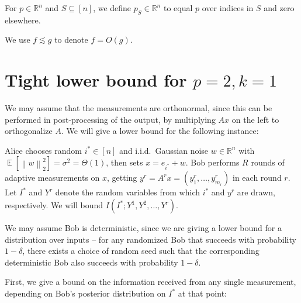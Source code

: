 \documentclass[twoside,leqno,twocolumn]{article}
\newcommand{\norm}[2]{\left \lVert#2\right \rVert_{#1}}
\DeclareMathOperator*{\E}{\mathbb{E}}
\def\R{\mathbb{R}}
\begin{document}
For $p \in \R^n$ and $S \subseteq [n]$, we define $p_S \in \R^n$ to
equal $p$ over indices in $S$ and zero elsewhere.

We use $f \lesssim g$ to denote $f = O(g)$.

\section{Tight lower bound for $p=2, k=1$ }

We may assume that the measurements are orthonormal, since this can be
performed in post-processing of the output, by multiplying $Ax$ on the
left to orthogonalize $A$.  We will give a lower bound for the
following instance:

Alice chooses random $i^* \in [n]$ and i.i.d.\ Gaussian noise $w \in \R^n$
with $\E[\norm{2}{w}^2] = \sigma^2 = \Theta(1)$, then sets $x =
e_{i^*} + w$.  Bob performs $R$ rounds of adaptive measurements on
$x$, getting $y^r = A^rx = (y^r_1, \dotsc, y^r_{m_r})$ in each round
$r$.  Let $I^*$ and $Y^r$ denote the random variables from which $i^*$
and $y^r$ are drawn, respectively.  We will bound $I(I^*; Y^1, Y^2,
\dotsc, Y^r)$.

We may assume Bob is deterministic, since we are giving a lower bound
for a distribution over inputs -- for any randomized Bob that succeeds
with probability $1-\delta$, there exists a choice of random seed such
that the corresponding deterministic Bob also succeeds with
probability $1-\delta$.

First, we give a bound on the information received from any single
measurement, depending on Bob's posterior distribution on $I^*$ at
that point:
\end{document}
